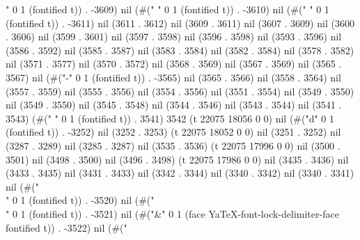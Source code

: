 " 0 1 (fontified t)) . -3609) nil (#(" " 0 1 (fontified t)) . -3610) nil (#(" " 0 1 (fontified t)) . -3611) nil (3611 . 3612) nil (3609 . 3611) nil (3607 . 3609) nil (3600 . 3606) nil (3599 . 3601) nil (3597 . 3598) nil (3596 . 3598) nil (3593 . 3596) nil (3586 . 3592) nil (3585 . 3587) nil (3583 . 3584) nil (3582 . 3584) nil (3578 . 3582) nil (3571 . 3577) nil (3570 . 3572) nil (3568 . 3569) nil (3567 . 3569) nil (3565 . 3567) nil (#("-" 0 1 (fontified t)) . -3565) nil (3565 . 3566) nil (3558 . 3564) nil (3557 . 3559) nil (3555 . 3556) nil (3554 . 3556) nil (3551 . 3554) nil (3549 . 3550) nil (3549 . 3550) nil (3545 . 3548) nil (3544 . 3546) nil (3543 . 3544) nil (3541 . 3543) (#(" " 0 1 (fontified t)) . 3541) 3542 (t 22075 18056 0 0) nil (#("d" 0 1 (fontified t)) . -3252) nil (3252 . 3253) (t 22075 18052 0 0) nil (3251 . 3252) nil (3287 . 3289) nil (3285 . 3287) nil (3535 . 3536) (t 22075 17996 0 0) nil (3500 . 3501) nil (3498 . 3500) nil (3496 . 3498) (t 22075 17986 0 0) nil (3435 . 3436) nil (3433 . 3435) nil (3431 . 3433) nil (3342 . 3344) nil (3340 . 3342) nil (3340 . 3341) nil (#("\\" 0 1 (fontified t)) . -3520) nil (#("\\" 0 1 (fontified t)) . -3521) nil (#("&" 0 1 (face YaTeX-font-lock-delimiter-face fontified t)) . -3522) nil (#("

